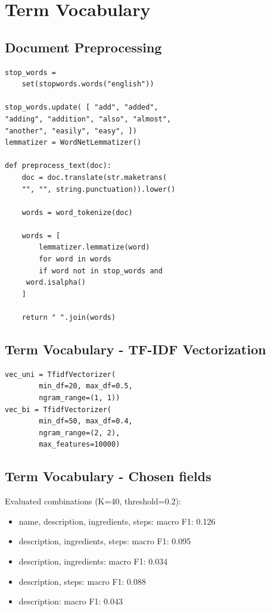 \documentclass[a4paper,11pt]{article}
\begin{document}
\section{Term Vocabulary}
\subsection{Document Preprocessing}
\begin{verbatim}
stop_words = 
    set(stopwords.words("english"))

stop_words.update( [ "add", "added", 
"adding", "addition", "also", "almost",
"another", "easily", "easy", ])
lemmatizer = WordNetLemmatizer()

def preprocess_text(doc):
    doc = doc.translate(str.maketrans(
    "", "", string.punctuation)).lower()

    words = word_tokenize(doc)

    words = [
        lemmatizer.lemmatize(word)
        for word in words
        if word not in stop_words and
     word.isalpha()
    ]

    return " ".join(words)
\end{verbatim}

\subsection{Term Vocabulary - TF-IDF Vectorization}
\begin{verbatim}
vec_uni = TfidfVectorizer(
        min_df=20, max_df=0.5,
        ngram_range=(1, 1))
vec_bi = TfidfVectorizer(
        min_df=50, max_df=0.4,
        ngram_range=(2, 2),
        max_features=10000)
\end{verbatim}

\subsection{Term Vocabulary - Chosen fields}
Evaluated combinations (K=40, threshold=0.2):
\begin{itemize}
    \item name, description, ingredients, steps: macro F1: 0.126
    \item description, ingredients, steps: macro F1: 0.095
    \item description, ingredients: macro F1: 0.034
    \item description, steps: macro F1: 0.088
    \item description: macro F1: 0.043
\end{itemize}
\end{document}
